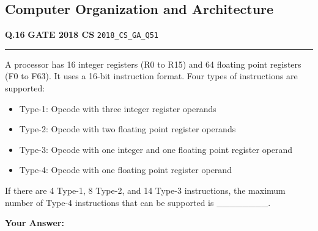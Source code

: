 \documentclass[a4paper,10pt]{article}
\begin{document}
\subsection*{Computer Organization and Architecture}
\vspace{-4pt}
\noindent
\begin{tcolorbox}[
    blanker,
    sidebyside,
    sidebyside align=top,
    lefthand width=0.55\textwidth,
    top=4pt, bottom=4pt, left=0pt, right=0pt,
    middle=16pt,
    underlay={
        \draw[dashed, black!80, line width=0.8pt, dash pattern=on 4pt off 3pt]
            ([xshift=0.55\textwidth+8pt]frame.north west) --
            ([xshift=0.55\textwidth+8pt]frame.south west);
    }
]
\textbf{Q.16}  \hfill {\footnotesize\textbf{GATE 2018 CS} \quad \tiny\texttt{2018\_CS\_GA\_Q51}}
\vspace{2pt}\hrule height 0.3pt\vspace{4pt}

A processor has 16 integer registers (R0 to R15) and 64 floating point registers (F0 to F63). It uses a 16-bit instruction format. Four types of instructions are supported:
\begin{itemize}[leftmargin=*, nosep]
    \item Type-1: Opcode with three integer register operands
    \item Type-2: Opcode with two floating point register operands
    \item Type-3: Opcode with one integer and one floating point register operand
    \item Type-4: Opcode with one floating point register operand
\end{itemize}
If there are 4 Type-1, 8 Type-2, and 14 Type-3 instructions, the maximum number of Type-4 instructions that can be supported is \_\_\_\_\_\_\_\_.

\par\vspace{6pt}\noindent\textbf{Your Answer:} \fbox{\rule{0pt}{1.3ex}\hspace{3cm}}

\tcblower


\end{tcolorbox}
\end{document}
